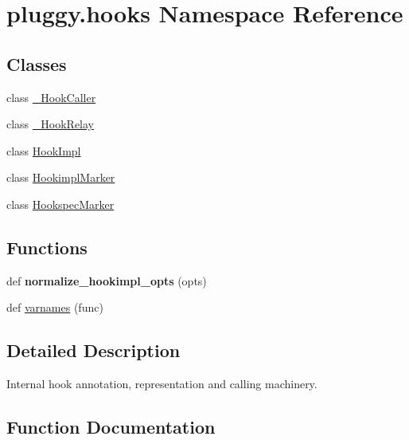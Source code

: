 \hypertarget{namespacepluggy_1_1hooks}{}\section{pluggy.\+hooks Namespace Reference}
\label{namespacepluggy_1_1hooks}
\subsection*{Classes}
\begin{DoxyCompactItemize}
\item 
class \hyperlink{classpluggy_1_1hooks_1_1___hook_caller}{\+\_\+\+Hook\+Caller}
\item 
class \hyperlink{classpluggy_1_1hooks_1_1___hook_relay}{\+\_\+\+Hook\+Relay}
\item 
class \hyperlink{classpluggy_1_1hooks_1_1_hook_impl}{Hook\+Impl}
\item 
class \hyperlink{classpluggy_1_1hooks_1_1_hookimpl_marker}{Hookimpl\+Marker}
\item 
class \hyperlink{classpluggy_1_1hooks_1_1_hookspec_marker}{Hookspec\+Marker}
\end{DoxyCompactItemize}
\subsection*{Functions}
\begin{DoxyCompactItemize}
\item 
\mbox{\label{namespacepluggy_1_1hooks_ae611818dc39e12b83de12ae982ca57d9}} 
def {\bfseries normalize\+\_\+hookimpl\+\_\+opts} (opts)
\item 
def \hyperlink{namespacepluggy_1_1hooks_a9ea78f8756d60049b782013dafd88234}{varnames} (func)
\end{DoxyCompactItemize}


\subsection{Detailed Description}
\begin{DoxyVerb}Internal hook annotation, representation and calling machinery.
\end{DoxyVerb}
 

\subsection{Function Documentation}
\mbox{\label{namespacepluggy_1_1hooks_a9ea78f8756d60049b782013dafd88234}} 
